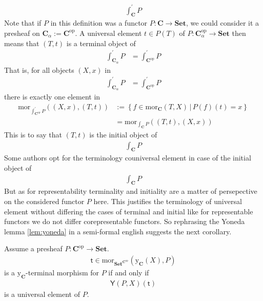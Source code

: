 \begin{align*}
  \int_{\mathbf{C}}^{\prime}
  P
\end{align*}
Note that if $P$ in this definition was a functor $P \colon \mathbf{C} \rightarrow \mathbf{Set}$, we could consider it a presheaf on $\mathbf{C}_{\alpha} := \mathbf{C}^{\mathrm{op}}$. A universal element $t \in P(T)$ of $P \colon \mathbf{C}_{\alpha}^{\mathrm{op}} \rightarrow \mathbf{Set}$ then means that $(T,t)$ is a terminal object of
\begin{align*}
  \int_{\mathbf{C}_{\alpha}}^{\prime}
  P
  &=
  \int_{\mathbf{C}^{\mathrm{op}}}^{\prime}
  P
\end{align*}
That is, for all objects $(X,x)$ in
\begin{align*}
  \int_{\mathbf{C}_{\alpha}}^{\prime}
  P
  &=
  \int_{\mathbf{C}^{\mathrm{op}}}^{\prime}
  P
\end{align*}
there is exactly one element in
\begin{align*}
  \mathrm{mor}_{\int_{\mathbf{C}^{\mathrm{op}}}^{\prime}P}
  \left(
    (X,x),
    (T,t)
  \right)
  &:=
  \left\lbrace
      f
      \in
      \mathrm{mor}_{\mathbf{C}}(T,X)
    \,
    \vert
    \,
      P(f)(t)
      =
      x
  \right\rbrace
  \\
  &=
  \mathrm{mor}_{\int_{\mathbf{C}}P}
  \left(
    (T,t),
    (X,x)
  \right)
\end{align*}
This is to say that $(T,t)$ is the initial object of
\begin{align*}
  \int_{\mathbf{C}}
  P
\end{align*}
Some authors opt for the terminology {\glqq}couniversal element{\grqq} in case of the initial object of
\begin{align*}
  \int_{\mathbf{C}}
  P
\end{align*}
But as for representability terminality and initiality are a matter of persepective on the considered functor $P$ here. This justifies the terminology of universal element without differing the cases of terminal and initial like for representable functors we do not differ corepresentable functors. So rephrasing the Yoneda lemma \ref{lem:yoneda} in a semi-formal english suggests the next corollary.
\\
\begin{cor}
\label{cor:unielemequivuni1}
Assume a presheaf $P \colon \mathbf{C}^{\mathrm{op}} \rightarrow \mathbf{Set}$.
\begin{align*}
  \mathsf{t}
  \in
  \mathrm{mor}_{\mathbf{Set}^{\mathbf{C}^{\mathrm{op}}}}
  (\mathrm{y}_{\mathbf{C}}(X),P)
\end{align*}
is a $\mathrm{y}_{\mathbf{C}}$-terminal morphism for $P$ if and only if
\begin{align*}
  \mathsf{Y}(P,X)(\mathsf{t})
\end{align*}
is a universal element of $P$.
\end{cor}
